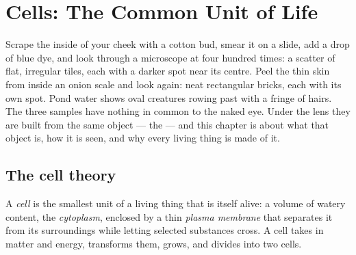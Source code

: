 \chapter{Cells: The Common Unit of Life}\label{ch:g10:cells-common-unit}

Scrape the inside of your cheek with a cotton bud, smear it on a slide,
add a drop of blue dye, and look through a microscope at four hundred
times: a scatter of flat, irregular tiles, each with a darker spot near
its centre. Peel the thin skin from inside an onion scale and look
again: neat rectangular bricks, each with its own spot. Pond water shows
oval creatures rowing past with a fringe of hairs. The three samples have
nothing in common to the naked eye. Under the lens they are built from
the same object --- the  --- and this chapter is about what that
object is, how it is seen, and why every living thing is made of it.

\section{The cell theory}

\begin{definition}[Cell]\label{def:g10:cells-common-unit:cell}
A \emph{cell} is the smallest unit of a living thing that is
itself alive: a volume of watery content, the
\emph{cytoplasm}, enclosed by a thin
\emph{plasma membrane} that separates it from
its surroundings while letting selected substances cross. A cell takes
in matter and energy, transforms them, grows, and divides into two
cells.
\end{definition}

